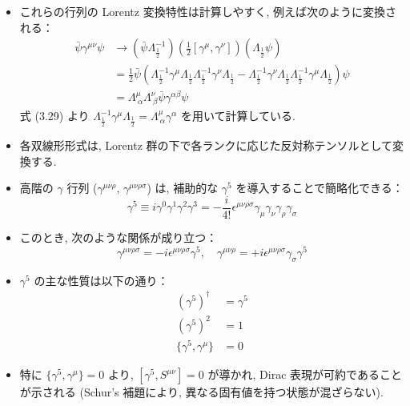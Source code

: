 \documentclass[a4paper,12pt]{article}
\begin{document}
\begin{itemize}
  \item これらの行列の Lorentz 変換特性は計算しやすく, 例えば次のように変換される：
  \begin{align*}
    \bar{\psi} \gamma^{\mu\nu} \psi &\rightarrow \left( \bar{\psi} \Lambda^{-1}_{\frac{1}{2}} \right) \left( \tfrac{1}{2}[\gamma^\mu, \gamma^\nu] \right) \left( \Lambda_{\frac{1}{2}} \psi \right) \\
    &= \tfrac{1}{2} \bar{\psi} \left( \Lambda^{-1}_{\frac{1}{2}} \gamma^\mu \Lambda_{\frac{1}{2}} \Lambda^{-1}_{\frac{1}{2}} \gamma^\nu \Lambda_{\frac{1}{2}} - \Lambda^{-1}_{\frac{1}{2}} \gamma^\nu \Lambda_{\frac{1}{2}} \Lambda^{-1}_{\frac{1}{2}} \gamma^\mu \Lambda_{\frac{1}{2}} \right) \psi \\
    &= \Lambda^\mu_{\ \alpha} \Lambda^\nu_{\ \beta} \bar{\psi} \gamma^{\alpha\beta} \psi
  \end{align*}
  \color{blue}
  式 (3.29) より $\Lambda^{-1}_{\frac{1}{2}} \gamma^\mu \Lambda_{\frac{1}{2}} = \Lambda^\mu_{\ \alpha}\gamma^{\alpha}$ を用いて計算している.
  \color{black}
  \item 各双線形形式は, Lorentz 群の下で各ランクに応じた反対称テンソルとして変換する.
  \item 高階の $\gamma$ 行列 ($\gamma^{\mu\nu\rho}$, $\gamma^{\mu\nu\rho\sigma}$) は, 補助的な $\gamma^5$ を導入することで簡略化できる：
  \begin{equation*}
    \gamma^5 \equiv i\gamma^0 \gamma^1 \gamma^2 \gamma^3 = -\frac{i}{4!} \epsilon^{\mu\nu\rho\sigma} \gamma_\mu \gamma_\nu \gamma_\rho \gamma_\sigma \tag{3.68}
  \end{equation*}

  \item このとき, 次のような関係が成り立つ：
  \begin{equation*}
    \gamma^{\mu\nu\rho\sigma} = -i \epsilon^{\mu\nu\rho\sigma} \gamma^5, \quad
    \gamma^{\mu\nu\rho} = +i \epsilon^{\mu\nu\rho\sigma} \gamma_\sigma \gamma^5
  \end{equation*}

  \item $\gamma^5$ の主な性質は以下の通り：
  \begin{align*}
    (\gamma^5)^\dagger &= \gamma^5 \tag{3.69}\\
    (\gamma^5)^2 &= 1 \tag{3.70}\\
    \{ \gamma^5, \gamma^\mu \} &= 0 \tag{3.71}
  \end{align*}

  \item 特に $\{ \gamma^5, \gamma^\mu \} = 0$ より, $[\gamma^5, S^{\mu\nu}] = 0$ が導かれ,
        Dirac 表現が可約であることが示される (Schur's 補題により, 異なる固有値を持つ状態が混ざらない).


\end{itemize}
\end{document}

